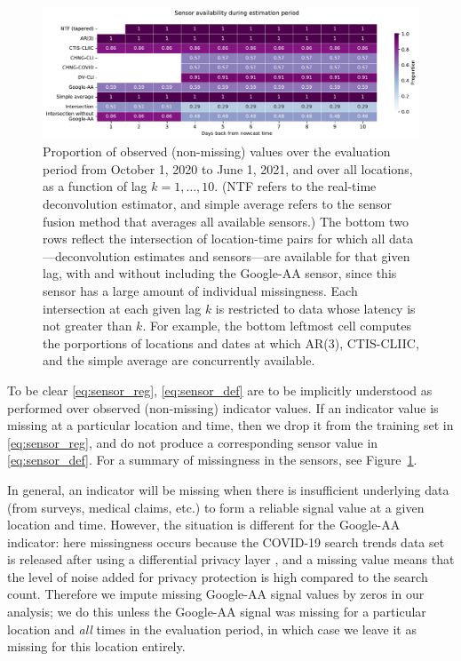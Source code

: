 \documentclass[sts]{imsart}
\theoremstyle{plain}
\theoremstyle{definition}
\theoremstyle{remark}
\begin{document}
\begin{figure}[tb]
\centering
\includegraphics[width=0.95\linewidth]{./figures/availability.pdf}
\caption{Proportion of observed (non-missing) values over the evaluation 
  period from October 1, 2020 to June 1, 2021, and over all locations, as a 
  function of lag $k=1,\ldots,10$. (NTF refers to the real-time deconvolution
  estimator, and simple average refers to the sensor fusion method that 
  averages all available sensors.) The bottom two rows reflect the
  intersection of location-time pairs for which all data---deconvolution 
  estimates and sensors---are available for that given lag, with and
  without including the Google-AA sensor, since this sensor has a large amount
  of individual missingness. Each intersection at each given lag $k$ is restricted
  to data whose latency is not greater than $k$. For example, the bottom
  leftmost cell computes the porportions of locations and dates at which AR(3), 
  CTIS-CLIIC, and the simple average are concurrently available.} 
\label{fig:sensor_avail}
\end{figure}

To be clear \eqref{eq:sensor_reg}, \eqref{eq:sensor_def} are to be implicitly
understood as performed over observed (non-missing) indicator values. If an
indicator value is missing at a particular location and time, then we drop it
from the training set in \eqref{eq:sensor_reg}, and do not produce a
corresponding sensor value in \eqref{eq:sensor_def}. For a summary of
missingness in the sensors, see Figure~\ref{fig:sensor_avail}.

In general, an indicator will be missing when there is insufficient underlying
data (from surveys, medical claims, etc.) to form a reliable signal value at a
given location and time. However, the situation is different for the Google-AA
indicator: here missingness occurs because the COVID-19 search trends data set
is released after using a differential privacy layer \citep{Bavadekar:2020}, and
a missing value means that the level of noise added for privacy protection is
high compared to the search count. Therefore we impute missing Google-AA signal
values by zeros in our analysis; we do this unless the Google-AA signal was
missing for a particular location and \emph{all} times in the evaluation period,
in which case we leave it as missing for this location entirely.
\end{document}
